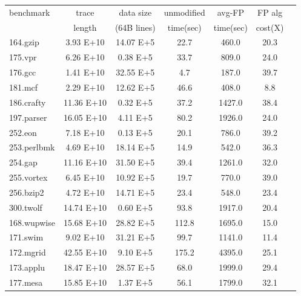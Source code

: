 \begin{table}[h]
\centering
\footnotesize
\begin{tabular}{|l|c|c|c|c|c|c|}
\hline
benchmark        &trace   &data size   &unmodified  &avg-FP &FP alg \\ 
&length &(64B lines) &time(sec) &time(sec) &cost(X)\\ \hline \hline
164.gzip         & 3.93 E+10     & 14.07 E+5     & 22.7          & 460.0         & 20.3 \\ \hline
175.vpr          & 6.26 E+10     & 0.38 E+5      & 33.7          & 809.0         & 24.0 \\ \hline
176.gcc          & 1.41 E+10     & 32.55 E+5     & 4.7   & 187.0         & 39.7 \\ \hline
181.mcf          & 2.29 E+10     & 12.62 E+5     & 46.6          & 408.0         & 8.8 \\ \hline
186.crafty       & 11.36 E+10    & 0.32 E+5      & 37.2          & 1427.0        & 38.4 \\ \hline
197.parser       & 16.05 E+10    & 4.11 E+5      & 80.2          & 1926.0        & 24.0 \\ \hline
252.eon          & 7.18 E+10     & 0.13 E+5      & 20.1          & 786.0         & 39.2 \\ \hline
253.perlbmk      & 4.69 E+10     & 18.14 E+5     & 14.9          & 542.0         & 36.3 \\ \hline
254.gap          & 11.16 E+10    & 31.50 E+5     & 39.4          & 1261.0        & 32.0 \\ \hline
255.vortex       & 6.45 E+10     & 10.92 E+5     & 19.7          & 770.0         & 39.0 \\ \hline
256.bzip2        & 4.72 E+10     & 14.71 E+5     & 23.4          & 548.0         & 23.4 \\ \hline
300.twolf        & 14.74 E+10    & 0.60 E+5      & 93.8          & 1917.0        & 20.4 \\ \hline
\hline
168.wupwise      & 15.68 E+10    & 28.82 E+5     & 112.8         & 1695.0        & 15.0 \\ \hline
171.swim         & 9.02 E+10     & 31.21 E+5     & 99.7          & 1141.0        & 11.4 \\ \hline
172.mgrid        & 42.55 E+10    & 9.10 E+5      & 175.2         & 4395.0        & 25.1 \\ \hline
173.applu        & 18.47 E+10    & 28.57 E+5     & 68.0          & 1999.0        & 29.4 \\ \hline
177.mesa         & 15.85 E+10    & 1.37 E+5      & 56.1          & 1799.0        & 32.1 \\ \hline

\end{tabular}
\end{table}
